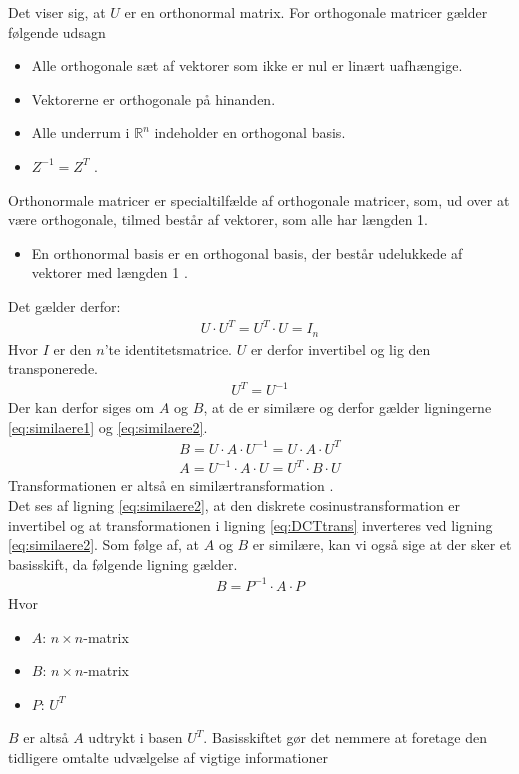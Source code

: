 Det viser sig, at $U$ er en orthonormal matrix. For orthogonale matricer gælder følgende udsagn
\begin{itemize}
	\item[]Alle orthogonale sæt af vektorer som ikke er nul er linært uafhængige.
	\item[]Vektorerne er orthogonale på hinanden.
	\item[]Alle underrum i $\mathbb{R}^n$ indeholder en orthogonal basis.
	\item[]$Z^{-1} = Z^T$ \citep{linalg}.
\end{itemize}
Orthonormale matricer er specialtilfælde af orthogonale matricer, som, ud over at være orthogonale, tilmed består af vektorer, som alle har længden 1.
\begin{itemize}
\item[] En orthonormal basis er en orthogonal basis, der består udelukkede af vektorer med længden 1 \citep{linalg}.
\end{itemize}
Det gælder derfor:
\begin{align}
U \cdot U^T = U^T \cdot U = I_n
\label{eq:ortho}
\end{align}
Hvor $I$ er den $n$'te identitetsmatrice. $U$ er derfor invertibel og lig den transponerede.
\begin{align}
U^T=U^{-1}
\end{align}
Der kan derfor siges om $A$ og $B$, at de er similære og derfor gælder ligningerne \ref{eq:similaere1} og \ref{eq:similaere2}.
\begin{align}
B = U \cdot A \cdot U^{-1} = U \cdot A \cdot U^T
\label{eq:similaere1}
\end{align}
\begin{align}
A = U^{-1} \cdot A \cdot U = U^T \cdot B \cdot U
\label{eq:similaere2}
\end{align}
Transformationen er altså en similærtransformation \citep{similar_wolfram}.\\
Det ses af ligning \ref{eq:similaere2}, at den diskrete cosinustransformation er invertibel og at transformationen i ligning \vref{eq:DCTtrans} inverteres ved ligning \ref{eq:similaere2}.
Som følge af, at $A$ og $B$ er similære, kan vi også sige at der sker et basisskift, da følgende ligning gælder.
\begin{align}
B=P^{-1} \cdot A \cdot P
\end{align}
Hvor
\begin{itemize}
	\item{$A$: $n \times n$-matrix}
	\item{$B$: $n \times n$-matrix}
	\item{$P$: $U^T$}
\end{itemize}
$B$ er altså $A$ udtrykt i basen $U^T$. Basisskiftet gør det nemmere at foretage den tidligere omtalte udvælgelse af vigtige informationer

